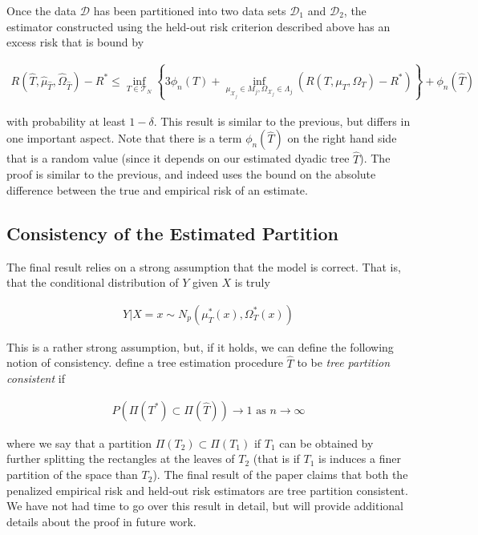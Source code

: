 \documentclass[12pt]{article}
\begin{document}
Once the data $\mathcal{D}$ has been partitioned into two data sets
$\mathcal{D}_1$ and $\mathcal{D}_2$, the estimator constructed using
the held-out risk criterion described above has an excess risk that is
bound by

\begin{align}
    R(\hat{T}, \hat{\mu}_{\hat{T}}, \hat{\Omega}_{\hat{T}}) - R^*
    \le \underset{T \in \mathcal{T}_N}{\inf}
    \left\{
        3 \phi_n(T) +
        \underset{\mu_{\mathcal{X}_j} \in M_j, \Omega_{\mathcal{X}_j} \in \Lambda_j}{\inf}
        (R(T, \mu_T, \Omega_T) - R^*)
    \right\} + \phi_n (\hat{T})
\end{align}

with probability at least $1 - \delta$. This result is similar to the
previous, but differs in one important aspect. Note that there is a
term $\phi_n(\hat{T})$ on the right hand side that is a random value
(since it depends on our estimated dyadic tree $\hat{T}$). The proof
is similar to the previous, and indeed uses the bound on the absolute
difference between the true and empirical risk of an estimate.

\subsection{Consistency of the Estimated Partition}

The final result relies on a strong assumption that the model is
correct. That is, that the conditional distribution of $Y$ given $X$
is truly

\begin{align}
    Y | X = x \sim N_p(\mu^*_T(x), \Omega_T^*(x))
\end{align}

This is a rather strong assumption, but, if it holds, we can define
the following notion of consistency. \cite{liu2010} define a tree
estimation procedure $\hat{T}$ to be \textit{tree partition
  consistent} if

\begin{align}
    P \left(
        \Pi(T^*) \subset \Pi(\hat{T})
    \right) \to 1
    \text{ as } n \to \infty
\end{align}

where we say that a partition $\Pi(T_2) \subset \Pi(T_1)$ if $T_1$ can
be obtained by further splitting the rectangles at the leaves of $T_2$
(that is if $T_1$ is induces a finer partition of the space than
$T_2$). The final result of the paper claims that both the penalized
empirical risk and held-out risk estimators are tree partition
consistent. We have not had time to go over this result in detail, but
will provide additional details about the proof in future work.
\end{document}
